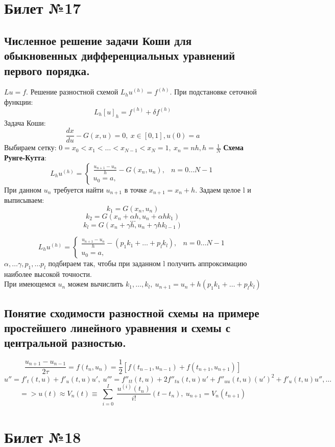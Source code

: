\documentclass[a4paper]{article}
\begin{document}
\section{Билет №17}
\subsection{Численное решение задачи Коши для обыкновенных дифференциальных уравнений первого порядка.}
$Lu=f$. Решение разностной схемой $L_hu^{(h)}=f^{(h)}$. При подстановке сеточной функции: $$ L_h[u]_h=f^{(h)}+\delta f^{(h)} $$
Задача Коши: $$ \frac{dx}{du}-G(x,u)=0,\ x\in[0,1],u(0)=a $$
Выбираем сетку: $0=x_0<x_1<\ldots<x_{N-1}<x_N=1, \ x_n=nh, h=\frac{1}{N}$ 
\textbf{Схема Рунге-Кутта}:\\
	$$L_hu^{(h)} = \begin{cases}
	\frac{u_{n+1}-u_n}{h} - G(x_n,u_n), & n=0\ldots N-1\\
	u_0=a, & \end{cases}$$
При данном $u_n$ требуется найти $u_{n+1}$ в точке $x_{n+1}=x_n+h$. Задаем целое l и выписываем:
$$ k_1=G(x_n,u_n)$$
$$ k_2=G(x_n + \alpha h, u_n+\alpha hk_1) $$
$$ \ldots $$
$$ k_l = G(x_n + \gamma h, u_n + \gamma hk_{l-1}) $$

$$L_hu^{(h)} = \begin{cases}
	\frac{u_{n+1}-u_n}{h} - (p_1 k_1 + \ldots + p_l k_l), & n=0\ldots N-1\\
	u_0=a, & \end{cases}$$
$\alpha, \ldots \gamma, p_1, \ldots p_l$ подбираем так, чтобы при заданном l получить аппроксимацию наиболее высокой точности. \\
При имеющемся $u_n$ можем вычислить $k_1, \ldots, k_l, \ u_{n+1}=u_n+h(p_1k_1 + \ldots + p_l k_l)$
\subsection{Понятие сходимости разностной схемы на примере простейшего линейного уравнения и схемы с центральной разностью.}
$$ \frac{u_{n+1}-u_{n-1}}{2\tau} = f(t_n,u_n)=\frac{1}{2}[f(t_{n-1},u_{n-1}) + f(t_{n+1},u_{n+1})] $$
$$ u'' = f'_t(t,u)+f'_u(t,u)u', \ u'''=f''_{tt}(t,u)+2f''_{tu}(t,u)u' +f''_{uu}(t,u)(u')^2+f'_u(t,u)u'', \ldots $$
$$ => u(t) \approx V_n(t) \equiv \sum_{\substack{i=0}}^I \frac{u^{(i)}(t_n)}{i!}(t-t_n), \ u_{n+1}=V_n(t_{n+1}) $$

\section{Билет №18}
\end{document}
